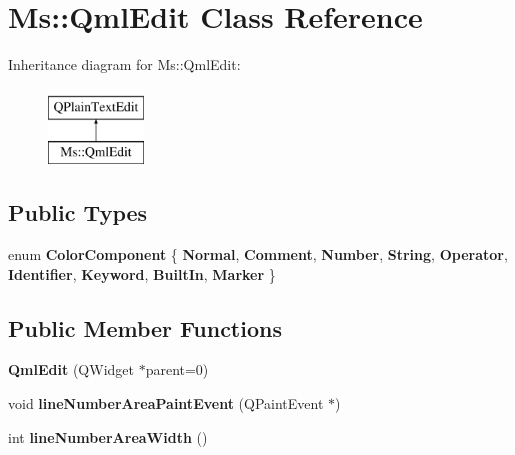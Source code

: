 \hypertarget{class_ms_1_1_qml_edit}{}\section{Ms\+:\+:Qml\+Edit Class Reference}
\label{class_ms_1_1_qml_edit}
Inheritance diagram for Ms\+:\+:Qml\+Edit\+:\begin{figure}[H]
\begin{center}
\leavevmode
\includegraphics[height=2.000000cm]{class_ms_1_1_qml_edit}
\end{center}
\end{figure}
\subsection*{Public Types}
\begin{DoxyCompactItemize}
\item 
\mbox{\label{class_ms_1_1_qml_edit_aac7bdac158e9c706d6451d378cddd043}} 
enum {\bfseries Color\+Component} \{ \newline
{\bfseries Normal}, 
{\bfseries Comment}, 
{\bfseries Number}, 
{\bfseries String}, 
\newline
{\bfseries Operator}, 
{\bfseries Identifier}, 
{\bfseries Keyword}, 
{\bfseries Built\+In}, 
\newline
{\bfseries Marker}
 \}
\end{DoxyCompactItemize}
\subsection*{Public Member Functions}
\begin{DoxyCompactItemize}
\item 
\mbox{\label{class_ms_1_1_qml_edit_ae0d13a9c0a2f7466d87d92aecf3e1f9e}} 
{\bfseries Qml\+Edit} (Q\+Widget $\ast$parent=0)
\item 
\mbox{\label{class_ms_1_1_qml_edit_a88ada4dbc68cf44b63f3864a296edd77}} 
void {\bfseries line\+Number\+Area\+Paint\+Event} (Q\+Paint\+Event $\ast$)
\item 
\mbox{\label{class_ms_1_1_qml_edit_ae0865e1a125f317dba3d4314c3fa6826}} 
int {\bfseries line\+Number\+Area\+Width} ()
\end{DoxyCompactItemize}
